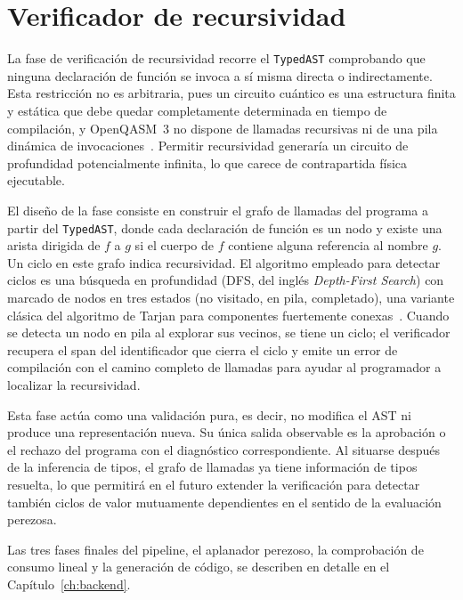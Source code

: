 \section{Verificador de recursividad}
\label{sec:recursivity-checker}

La fase de verificación de recursividad recorre el \lstinline|TypedAST| comprobando que ninguna declaración de función se invoca a sí misma directa o indirectamente. Esta restricción no es arbitraria, pues un circuito cuántico es una estructura finita y estática que debe quedar completamente determinada en tiempo de compilación, y OpenQASM~3 no dispone de llamadas recursivas ni de una pila dinámica de invocaciones~\cite{openqasm3_2022}. Permitir recursividad generaría un circuito de profundidad potencialmente infinita, lo que carece de contrapartida física ejecutable.

El diseño de la fase consiste en construir el grafo de llamadas del programa a partir del \lstinline|TypedAST|, donde cada declaración de función es un nodo y existe una arista dirigida de $f$ a $g$ si el cuerpo de $f$ contiene alguna referencia al nombre $g$. Un ciclo en este grafo indica recursividad. El algoritmo empleado para detectar ciclos es una búsqueda en profundidad (DFS, del inglés \textit{Depth-First Search}) con marcado de nodos en tres estados (no visitado, en pila, completado), una variante clásica del algoritmo de Tarjan para componentes fuertemente conexas~\cite{aho_compiladores_2006}. Cuando se detecta un nodo en pila al explorar sus vecinos, se tiene un ciclo; el verificador recupera el span del identificador que cierra el ciclo y emite un error de compilación con el camino completo de llamadas para ayudar al programador a localizar la recursividad.

Esta fase actúa como una validación pura, es decir, no modifica el AST ni produce una representación nueva. Su única salida observable es la aprobación o el rechazo del programa con el diagnóstico correspondiente. Al situarse después de la inferencia de tipos, el grafo de llamadas ya tiene información de tipos resuelta, lo que permitirá en el futuro extender la verificación para detectar también ciclos de valor mutuamente dependientes en el sentido de la evaluación perezosa.

Las tres fases finales del pipeline, el aplanador perezoso, la comprobación de consumo lineal y la generación de código, se describen en detalle en el Capítulo~\ref{ch:backend}.
